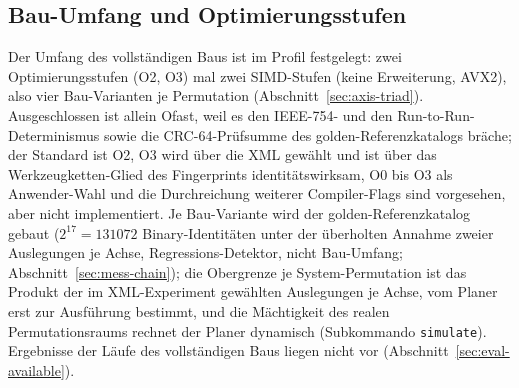 \begin{nurkurz}
\subsection{Bau-Umfang und Optimierungsstufen}\label{sec:eval-build-scope}
Der Umfang des vollständigen Baus ist im Profil festgelegt: zwei Optimierungsstufen (O2, O3) mal zwei
SIMD-Stufen (keine Erweiterung, AVX2), also vier Bau-Varianten je Permutation
(Abschnitt~\ref{sec:axis-triad}). Ausgeschlossen ist allein Ofast, weil es den IEEE-754- und den
Run-to-Run-Determinismus sowie die CRC-64-Prüfsumme des golden-Referenzkatalogs bräche; der Standard ist
O2, O3 wird über die XML gewählt und ist über das Werkzeugketten-Glied des Fingerprints
identitätswirksam, O0 bis O3 als Anwender-Wahl und die Durchreichung weiterer Compiler-Flags sind
vorgesehen, aber nicht implementiert. Je Bau-Variante wird der golden-Referenzkatalog gebaut
($2^{17} = 131072$ Binary-Identitäten unter der überholten Annahme zweier Auslegungen je Achse,
Regressions-Detektor, nicht Bau-Umfang; Abschnitt~\ref{sec:mess-chain}); die Obergrenze je System-Permutation
ist das Produkt der im XML-Experiment gewählten Auslegungen je Achse, vom Planer erst zur Ausführung bestimmt,
und die Mächtigkeit des realen Permutationsraums rechnet der Planer dynamisch (Subkommando \texttt{simulate}). Ergebnisse der Läufe des
vollständigen Baus liegen nicht vor (Abschnitt~\ref{sec:eval-available}).
\end{nurkurz}

